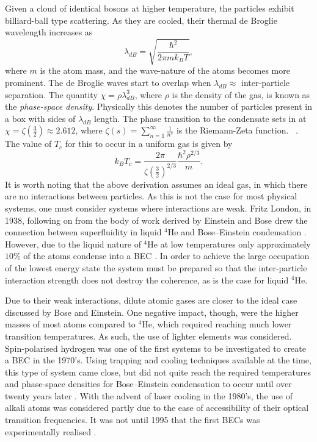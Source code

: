 Given a cloud of identical bosons at higher temperature, the particles exhibit billiard-ball type scattering. As they are cooled, their thermal de Broglie wavelength increases as
\begin{equation}
\lambda_{dB} = \sqrt{\frac{\hbar^2}{2\pi mk_{B}T}},
\end{equation}
where $m$ is the atom mass, and the wave-nature of the atoms becomes more prominent. The de Broglie waves start to overlap when $\lambda_{dB} \approx$ inter-particle separation. The quantity $\chi=\rho\lambda_{dB}^3$, where $\rho$ is the density of the gas, is known as the \emph{phase-space density}. Physically this denotes the number of particles present in a box with sides of $\lambda_{dB}$ length. The phase transition to the condensate sets in at $\chi = \zeta\left(\frac{3}{2}\right)\approx 2.612$, where $\zeta(s) = \displaystyle\sum\limits_{n=1}^{\infty}\frac{1}{n^s}$ is the Riemann-Zeta function. ~\cite{BK:Ueda_2010}. The value of $T_c$ for this to occur in a uniform gas is given by
\begin{equation}
k_BT_c = \frac{2\pi}{\zeta\left(\frac{3}{2}\right)^{2/3}}\frac{\hbar^2\rho^{2/3}}{m}.
\end{equation}
It is worth noting that the above derivation assumes an ideal gas, in which there are no interactions between particles. As this is not the case for most physical systems, one must consider systems where interactions are weak. Fritz London, in 1938, following on from the body of work derived by Einstein and Bose drew the connection between superfluidity in liquid $^4$He and Bose--Einstein condensation \cite[Chap.~1]{BK:Pitaevskii_Stringari_2003}. However, due to the liquid nature of $^4$He at low temperatures only approximately $10\%$ of the atoms condense into a BEC \cite{BEC:Penrose_pr_1956}. In order to achieve the large occupation of the lowest energy state the system must be prepared so that the inter-particle interaction strength does not destroy the coherence, as is the case for liquid $^4$He.

Due to their weak interactions, dilute atomic gases are closer to the ideal case discussed by Bose and Einstein. One negative impact, though, were the higher masses of most atoms compared to $^4$He, which required reaching much lower transition temperatures. As such, the use of lighter elements was considered. Spin-polarised hydrogen was one of the first systems to be investigated to create a BEC \cite{BEC:Kleppner_enfe_1998,BEC:Fried_prl_1998,BK:Pitaevskii_Stringari_2003} in the 1970's. Using trapping and cooling techniques available at the time, this type of system came close, but did not quite reach the required temperatures and phase-space densities for Bose--Einstein condensation to occur until over twenty years later \cite{BEC:Fried_prl_1998}. With the advent of laser cooling in the 1980's, the use of alkali atoms was considered partly due to the ease of accessibility of their optical transition frequencies. It was not until 1995 that the first BECs was experimentally realised \cite{BEC:Cornell_science_1995,BEC:Ketterle_prl_1995}.

